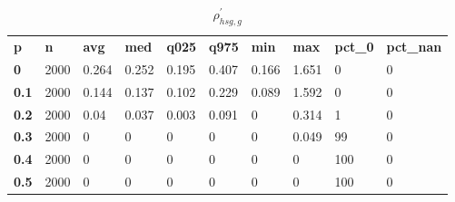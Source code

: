 \begin{table}[h]
 \centering 
\footnotesize
\caption{$\rho_{hsg,g}^\prime $}
\label{tab:alphahsgg}
\begin{tabular}[h]{| l l l l l l l l l l|
    } \hline
\textbf{ p} & \textbf{ n} & \textbf{ avg} & \textbf{ med} & \textbf{ q025} & \textbf{ q975} & \textbf{ min} & \textbf{ max} & \textbf{ pct\_0} & \textbf{ pct\_nan}
           \\
  \textbf{  0} & 2000 & 0.264 & 0.252 & 0.195 & 0.407 & 0.166 & 1.651 &   0 & 0
           \\
  \textbf{0.1} & 2000 & 0.144 & 0.137 & 0.102 & 0.229 & 0.089 & 1.592 &   0 & 0
           \\
  \textbf{0.2} & 2000 &  0.04 & 0.037 & 0.003 & 0.091 &     0 & 0.314 &   1 & 0
           \\
  \textbf{0.3} & 2000 &     0 &     0 &     0 &     0 &     0 & 0.049 &  99 & 0
           \\
  \textbf{0.4} & 2000 &     0 &     0 &     0 &     0 &     0 &     0 & 100 & 0
           \\
  \textbf{0.5} & 2000 &     0 &     0 &     0 &     0 &     0 &     0 & 100 & 0
           \\
 \hline \end{tabular}
 \end{table}
